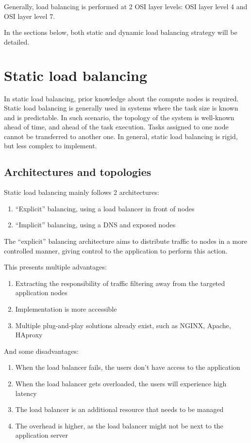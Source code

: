\documentclass[conference]{IEEEtran}
\begin{document}
    Generally, load balancing is performed at 2 OSI layer levels: OSI layer level 4 and OSI layer level 7.

    In the sections below, both static and dynamic load balancing strategy will be detailed.

\section{Static load balancing}
    In static load balancing, prior knowledge about the compute nodes is required. Static load balancing is generally used
in systems where the task size is known and is predictable. In such scenario, the topology of the system is well-known ahead
of time, and ahead of the task execution. Tasks assigned to one node cannot be transferred to another one.
In general, static load balancing is rigid, but less complex to implement.

\subsection{Architectures and topologies}
    Static load balancing mainly follows 2 architectures:

    \begin{enumerate}
        \item ``Explicit'' balancing, using a load balancer in front of nodes \cite{b1}
        \item ``Implicit'' balancing, using a DNS and exposed nodes \cite{b3}
    \end{enumerate}

    The ``explicit'' balancing architecture aims to distribute traffic to nodes in a more controlled manner, giving
control to the application to perform this action.

    This presents multiple advantages:

    \begin{enumerate}
        \item Extracting the responsibility of traffic filtering away from the targeted application nodes
        \item Implementation is more accessible
        \item Multiple plug-and-play solutions already exist, such as NGINX, Apache, HAproxy
    \end{enumerate}

    And some disadvantages:

    \begin{enumerate}
        \item When the load balancer fails, the users don't have access to the application
        \item When the load balancer gets overloaded, the users will experience high latency
        \item The load balancer is an additional resource that needs to be managed
        \item The overhead is higher, as the load balancer might not be next to the application server
    \end{enumerate}
    
\end{document}
